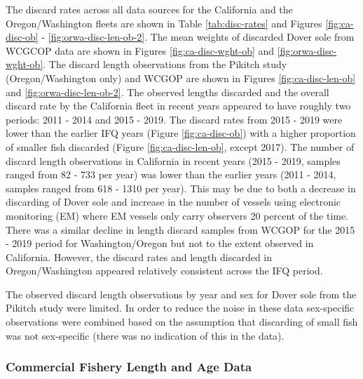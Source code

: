 \documentclass[11pt,
  english,
  a4paper,
]{article}
\begin{document}
\leavevmode\tagmcend\tagstructend\par


The discard rates across all data sources for the California and the Oregon/Washington fleets are shown in Table \ref{tab:disc-rates} and Figures \ref{fig:ca-disc-ob} - \ref{fig:orwa-disc-len-ob-2}. The mean weights of discarded Dover sole from WCGCOP data are shown in Figures \ref{fig:ca-disc-wght-ob} and \ref{fig:orwa-disc-wght-ob}. The discard length observations from the Pikitch study (Oregon/Washington only) and WCGOP are shown in Figures \ref{fig:ca-disc-len-ob} and \ref{fig:orwa-disc-len-ob-2}. The observed lengths discarded and the overall discard rate by the California fleet in recent years appeared to have roughly two periods: 2011 - 2014 and 2015 - 2019. The discard rates from 2015 - 2019 were lower than the earlier IFQ years (Figure \ref{fig:ca-disc-ob}) with a higher proportion of smaller fish discarded (Figure \ref{fig:ca-disc-len-ob}, except 2017). The number of discard length observations in California in recent years (2015 - 2019, samples ranged from 82 - 733 per year) was lower than the earlier years (2011 - 2014, samples ranged from 618 - 1310 per year). This may be due to both a decrease in discarding of Dover sole and increase in the number of vessels using electronic monitoring (EM) where EM vessels only carry observers 20 percent of the time. There was a similar decline in length discard samples from WCGOP for the 2015 - 2019 period for Washington/Oregon but not to the extent observed in California. However, the discard rates and length discarded in Oregon/Washington appeared relatively consistent across the IFQ period.

\leavevmode\tagmcend\tagstructend\par


The observed discard length observations by year and sex for Dover sole from the Pikitch study were limited. In order to reduce the noise in these data sex-specific observations were combined based on the assumption that discarding of small fish was not sex-specific (there was no indication of this in the data).

\leavevmode\tagmcend\tagstructend\par


\hypertarget{commercial-fishery-length-and-age-data}{%
\subsubsection{Commercial Fishery Length and Age Data}\label{commercial-fishery-length-and-age-data}}
\end{document}
